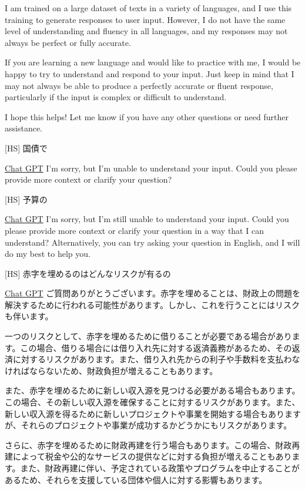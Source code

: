 \documentclass[
]{book}
\theoremstyle{definition}
\theoremstyle{definition}
\theoremstyle{definition}
\theoremstyle{definition}
\theoremstyle{remark}
\begin{document}
I am trained on a large dataset of texts in a variety of languages, and I use this training to generate responses to user input. However, I do not have the same level of understanding and fluency in all languages, and my responses may not always be perfect or fully accurate.

If you are learning a new language and would like to practice with me, I would be happy to try to understand and respond to your input. Just keep in mind that I may not always be able to produce a perfectly accurate or fluent response, particularly if the input is complex or difficult to understand.

I hope this helps! Let me know if you have any other questions or need further assistance.

{[}HS{]} 国債で

\protect\hyperlink{chatgpt}{Chat GPT} I'm sorry, but I'm unable to understand your input. Could you please provide more context or clarify your question?

{[}HS{]} 予算の

\protect\hyperlink{chatgpt}{Chat GPT} I'm sorry, but I'm still unable to understand your input. Could you please provide more context or clarify your question in a way that I can understand? Alternatively, you can try asking your question in English, and I will do my best to help you.

{[}HS{]} 赤字を埋めるのはどんなリスクが有るの

\protect\hyperlink{chatgpt}{Chat GPT} ご質問ありがとうございます。赤字を埋めることは、財政上の問題を解決するために行われる可能性があります。しかし、これを行うことにはリスクも伴います。

一つのリスクとして、赤字を埋めるために借りることが必要である場合があります。この場合、借りる場合には借り入れ先に対する返済義務があるため、その返済に対するリスクがあります。また、借り入れ先からの利子や手数料を支払わなければならないため、財政負担が増えることもあります。

また、赤字を埋めるために新しい収入源を見つける必要がある場合もあります。この場合、その新しい収入源を確保することに対するリスクがあります。また、新しい収入源を得るために新しいプロジェクトや事業を開始する場合もありますが、それらのプロジェクトや事業が成功するかどうかにもリスクがあります。

さらに、赤字を埋めるために財政再建を行う場合もあります。この場合、財政再建によって税金や公的なサービスの提供などに対する負担が増えることもあります。また、財政再建に伴い、予定されている政策やプログラムを中止することがあるため、それらを支援している団体や個人に対する影響もあります。
\end{document}
